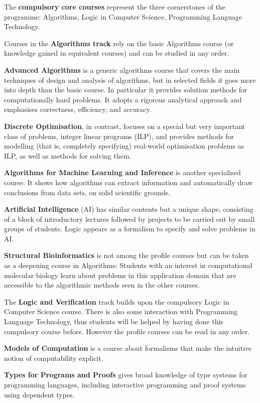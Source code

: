 \documentclass[twocolumn]{article}
\begin{document}
\bigskip
%
The {\bf compulsory core courses} represent the three cornerstones of the 
programme: Algorithms, Logic in Computer Science, Programming Language 
Technology.

\bigskip
%
Courses in the {\bf Algorithms track} rely on the basic Algorithms course (or
knowledge gained in equivalent courses) and can be studied in any order.

{\bf Advanced Algorithms} is a generic algorithms course that covers
the main techniques of design and analysis of algorithms, but in
selected fields it goes more into depth than the basic course. In
particular it provides solution methods for computationally hard
problems. It adopts a rigorous analytical approach and emphasises
correctness, efficiency, and accuracy.

{\bf Discrete Optimisation}, in contrast, focuses on a special but
very important class of problems, integer linear programs (ILP), and
provides methods for modelling (that is, completely specifying)
real-world optimisation problems as ILP, as well as methods for
solving them.

{\bf Algorithms for Machine Learning and Inference} is another
specialised course. It shows how algorithms can extract information
and automatically draw conclusions from data sets, on solid scientific
grounds.

{\bf Artificial Intelligence} (AI) has similar contents but a unique
shape, consisting of a block of introductory lectures followed by
projects to be carried out by small groups of students. Logic appears
as a formalism to specify and solve problems in AI.

{\bf Structural Bioinformatics} is not among the profile courses but
can be taken as a deepening course in Algorithms: Students with an
interest in computational molecular biology learn about problems in
this application domain that are accessible to the algorithmic methods
seen in the other courses.

\bigskip
%
The {\bf Logic and Verification} track builds upon the compulsory
Logic in Computer Science course. There is also some interaction with
Programming Language Technology, thus students will be helped by
having done this compulsory course before. However the profile courses
can be read in any order.

{\bf Models of Computation} is a course about formalisms that make the
intuitive notion of computability explicit.

{\bf Types for Programs and Proofs} gives broad knowledge of type
systems for programming languages, including interactive programming
and proof systems using dependent types.
\end{document}
